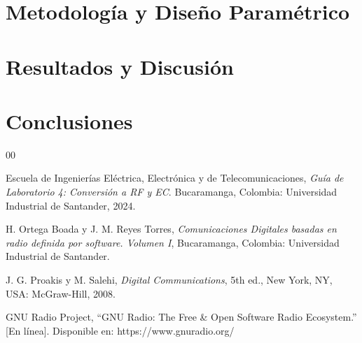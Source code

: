 \documentclass[conference, 10pt]{IEEEtran}
\begin{document}
\section{Metodología y Diseño Paramétrico}








\section{Resultados y Discusión}








\section{Conclusiones}


\begin{thebibliography}{00}

Escuela de Ingenierías Eléctrica, Electrónica y de Telecomunicaciones, \textit{Guía de Laboratorio 4: Conversión a RF y EC}. Bucaramanga, Colombia: Universidad Industrial de Santander, 2024.

H. Ortega Boada y J. M. Reyes Torres, \textit{Comunicaciones Digitales basadas en radio definida por software. Volumen I}, Bucaramanga, Colombia: Universidad Industrial de Santander.

J. G. Proakis y M. Salehi, \textit{Digital Communications}, 5th ed., New York, NY, USA: McGraw-Hill, 2008.

GNU Radio Project, ``GNU Radio: The Free \& Open Software Radio Ecosystem.'' [En línea]. Disponible en: https://www.gnuradio.org/

\end{thebibliography}
\end{document}
